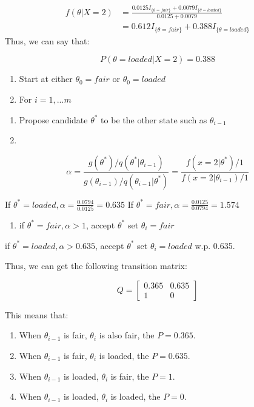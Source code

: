 \documentclass[]{book}
\providecommand{\tightlist}{%
  \setlength{\itemsep}{0pt}\setlength{\parskip}{0pt}}
\begin{document}
\[\begin{aligned} f(\theta |X=2) &=\frac{0.0125 I_{\{\theta=fair \}}+0.0079 I_{\{\theta=loaded \}} }{0.0125+0.0079} \\ &= 0.612 I_{\{\theta=fair \}} + 0.388 I_{\{\theta=loaded \}} \end{aligned}\]
Thus, we can say that:

\[P(\theta=loaded | X=2)=0.388\]

\begin{enumerate}
\def\labelenumi{(\arabic{enumi})}
\item
  Start at either \(\theta_0=fair\) or \(\theta_0=loaded\)
\item
  For \(i=1, ...m\)
\end{enumerate}

\begin{enumerate}
\def\labelenumi{(\alph{enumi})}
\item
  Propose candidate \(\theta^*\) to be the other state such as \(\theta_{i-1}\)
\item
\end{enumerate}

\[\alpha=\frac{g(\theta^*)/q(\theta^*|\theta_{i-1})}{g(\theta_{i-1})/q(\theta_{i-1}|\theta^*)}=\frac{f(x=2|\theta^*)/1}{f(x=2|\theta_{i-1})/1}\]

If \(\theta^*=loaded, \alpha=\frac{0.0794}{0.0125}=0.635\)
If \(\theta^*=fair, \alpha=\frac{0.0125}{0.0794}=1.574\)

\begin{enumerate}
\def\labelenumi{(\alph{enumi})}
\setcounter{enumi}{2}
\tightlist
\item
  if \(\theta^*=fair, \alpha>1\), accept \(\theta^*\) set \(\theta_i=fair\)
\end{enumerate}

if \(\theta^*=loaded, \alpha>0.635\), accept \(\theta^*\) set \(\theta_i=loaded\) w.p. 0.635.

Thus, we can get the following transition matrix:

\[Q=\begin{bmatrix} 0.365 & 0.635  \\ 1 & 0  \end{bmatrix}\]

This means that:

\begin{enumerate}
\def\labelenumi{(\arabic{enumi})}
\item
  When \(\theta_{i-1}\) is fair, \(\theta_{i}\) is also fair, the \(P=0.365\).
\item
  When \(\theta_{i-1}\) is fair, \(\theta_{i}\) is loaded, the \(P=0.635\).
\item
  When \(\theta_{i-1}\) is loaded, \(\theta_{i}\) is fair, the \(P=1\).
\item
  When \(\theta_{i-1}\) is loaded, \(\theta_{i}\) is loaded, the \(P=0\).
\end{enumerate}
\end{document}
